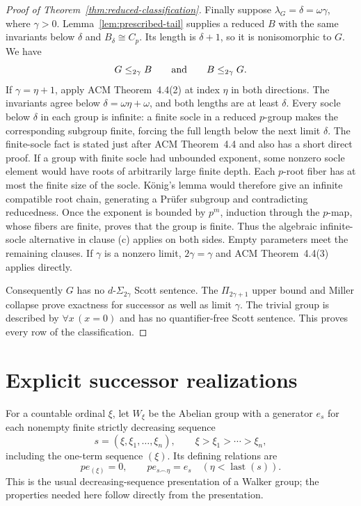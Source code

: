 \documentclass[11pt]{article}
\begin{document}
\begin{proof}[Proof of Theorem~\ref{thm:reduced-classification}]
Finally suppose $\lambda_G=\delta=\omega\gamma$, where $\gamma>0$.
Lemma~\ref{lem:prescribed-tail} supplies a reduced $B$ with the same
invariants below $\delta$ and $B_\delta\cong C_p$. Its length is
$\delta+1$, so it is nonisomorphic to $G$. We have
\[
               G\le_{2\gamma}B\qquad\hbox{and}\qquad B\le_{2\gamma}G.
\]
If $\gamma=\eta+1$, apply ACM Theorem~4.4(2) at index $\eta$ in
both directions. The invariants agree below
$\delta=\omega\eta+\omega$, and both lengths are at least $\delta$.
Every socle below $\delta$ in each group is infinite: a finite
socle in a reduced $p$-group makes the corresponding subgroup finite,
forcing the full length below the next limit $\delta$.
The finite-socle fact is stated just after ACM Theorem~4.4 and also
has a short direct proof. If a group with finite socle had unbounded
exponent, some nonzero socle element would have roots of arbitrarily
large finite depth. Each $p$-root fiber has at most the finite size of
the socle. K\"onig's lemma would therefore give an infinite compatible
root chain, generating a Pr\"ufer subgroup and contradicting
reducedness. Once the exponent is bounded by $p^m$, induction through
the $p$-map, whose fibers are finite, proves that the group is finite.
Thus the algebraic infinite-socle alternative in clause (c) applies
on both sides. Empty parameters meet the remaining clauses.
If $\gamma$ is a nonzero limit, $2\gamma=\gamma$ and ACM
Theorem~4.4(3) applies directly.

Consequently $G$ has no $d\text{-}\Sigma_{2\gamma}$ Scott sentence.
The $\Pi_{2\gamma+1}$ upper bound and Miller collapse prove exactness
for successor as well as limit $\gamma$. The trivial group is
described by $\forall x\,(x=0)$ and has no quantifier-free Scott
sentence. This proves every row of the classification.

\end{proof}
\section{Explicit successor realizations}\label{sec:walker}
For a countable ordinal $\xi$, let $W_\xi$ be the Abelian group with a
generator $e_s$ for each nonempty finite strictly decreasing sequence
\[
 s=(\xi,\xi_1,\ldots,\xi_n),\qquad
 \xi>\xi_1>\cdots>\xi_n,
\]
including the one-term sequence $(\xi)$. Its defining relations are
\[
 pe_{(\xi)}=0,
 \qquad pe_{s\mathbin{\smallfrown}\eta}=e_s
 \quad(\eta<\operatorname{last}(s)).
\]
This is the usual decreasing-sequence presentation of a Walker group;
the properties needed here follow directly from the presentation.
\end{document}
